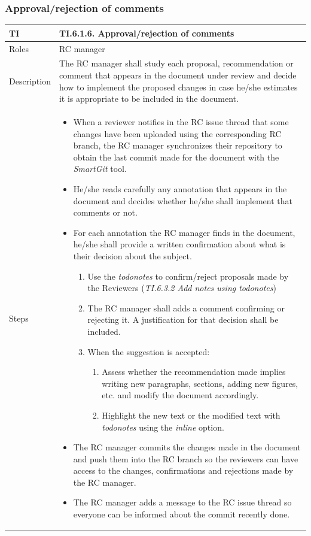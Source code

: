 \documentclass{template/openetcs_article}
\begin{document}
\subsubsection{Approval/rejection of comments}

\begin{flushleft}
\tablefirsthead{}
\tablehead{}
\tabletail{}
\tablelasttail{}
\begin{supertabular}{|m{2cm}|m{13cm}|}
\hline
{}
TI & 
TI.6.1.6. Approval/rejection of comments
\\\hline
Roles &
RC manager
\\\hline
Description &
The RC manager shall study each proposal, recommendation or comment that appears in the document under review and decide how to implement the proposed changes in case he/she estimates it is appropriate to be included in the document.  
\\\hline
Steps &
\begin{itemize}
\item When a reviewer notifies in the RC issue thread that some changes have been uploaded using the corresponding RC branch, the RC manager synchronizes their repository to obtain the last commit made for the document with the {\it SmartGit} tool.
\item He/she reads carefully any annotation that appears in the document and decides whether he/she shall implement that comments or not.
\item For each annotation the RC manager finds in the document, he/she shall provide a written confirmation about what is their decision about the subject. 
\begin{enumerate}
\item Use the {\it todonotes} to confirm/reject proposals made by the Reviewers ({\it TI.6.3.2 Add notes using todonotes}) 
\item The RC manager shall adds a comment confirming or rejecting it. A justification for that decision shall be included.
\item When the suggestion is accepted:
\begin{enumerate}
\item Assess whether the recommendation made implies writing new paragraphs, sections, adding new figures, etc. and modify the document accordingly. 
\item Highlight the new text or the modified text with {\it todonotes} using the {\it inline} option.
\end{enumerate}
\end{enumerate}
\item The RC manager commits the changes made in the document and push them into the RC branch so the reviewers can have access to the changes, confirmations and rejections made by the RC manager.
\item The RC manager adds a message to the RC issue thread so everyone can be informed about the commit recently done. 
\end{itemize}
\\\hline
\end{supertabular}
\end{flushleft}
\end{document}
